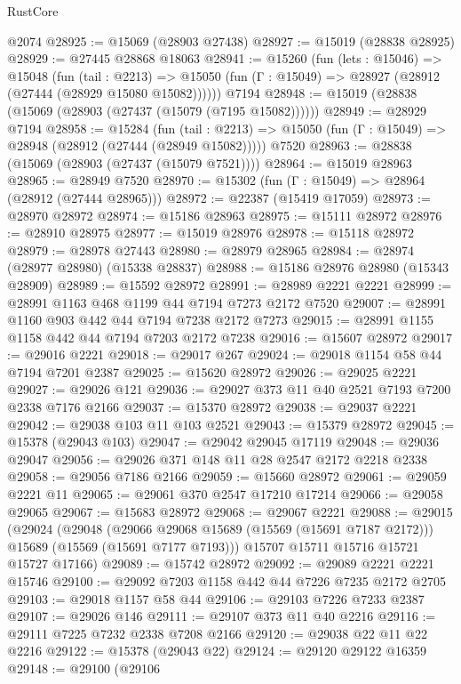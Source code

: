 \begin{lexlean}{RustCore}
\begin{coremodule}
    @2074
@28925 := @15069 (@28903 @27438)
@28927 := @15019 (@28838 @28925)
@28929 := @27445 @28868 @18063
@28941 := @15260
    (fun (lets : @15046) =>
    @15048
      (fun (tail : @2213) =>
      @15050 (fun (Γ : @15049) => @28927 (@28912 (@27444 (@28929 @15080 @15082))))))
    @7194
@28948 := @15019 (@28838 (@15069 (@28903 (@27437 (@15079 (@7195 @15082))))))
@28949 := @28929 @7194
@28958 := @15284
    (fun (tail : @2213) => @15050 (fun (Γ : @15049) => @28948 (@28912 (@27444 (@28949 @15082)))))
    @7520
@28963 := @28838 (@15069 (@28903 (@27437 (@15079 @7521))))
@28964 := @15019 @28963
@28965 := @28949 @7520
@28970 := @15302 (fun (Γ : @15049) => @28964 (@28912 (@27444 @28965)))
@28972 := @22387 (@15419 @17059)
@28973 := @28970 @28972
@28974 := @15186 @28963
@28975 := @15111 @28972
@28976 := @28910 @28975
@28977 := @15019 @28976
@28978 := @15118 @28972
@28979 := @28978 @27443
@28980 := @28979 @28965
@28984 := @28974 (@28977 @28980) (@15338 @28837)
@28988 := @15186 @28976 @28980 (@15343 @28909)
@28989 := @15592 @28972
@28991 := @28989 @2221 @2221
@28999 := @28991 @1163 @468 @1199 @44 @7194 @7273 @2172 @7520
@29007 := @28991 @1160 @903 @442 @44 @7194 @7238 @2172 @7273
@29015 := @28991 @1155 @1158 @442 @44 @7194 @7203 @2172 @7238
@29016 := @15607 @28972
@29017 := @29016 @2221
@29018 := @29017 @267
@29024 := @29018 @1154 @58 @44 @7194 @7201 @2387
@29025 := @15620 @28972
@29026 := @29025 @2221
@29027 := @29026 @121
@29036 := @29027 @373 @11 @40 @2521 @7193 @7200 @2338 @7176 @2166
@29037 := @15370 @28972
@29038 := @29037 @2221
@29042 := @29038 @103 @11 @103 @2521
@29043 := @15379 @28972
@29045 := @15378 (@29043 @103)
@29047 := @29042 @29045 @17119
@29048 := @29036 @29047
@29056 := @29026 @371 @148 @11 @28 @2547 @2172 @2218 @2338
@29058 := @29056 @7186 @2166
@29059 := @15660 @28972
@29061 := @29059 @2221 @11
@29065 := @29061 @370 @2547 @17210 @17214
@29066 := @29058 @29065
@29067 := @15683 @28972
@29068 := @29067 @2221
@29088 := @29015
    (@29024
      (@29048
        (@29066 @29068 @15689 (@15569 (@15691 @7187 @2172)))
        @15689
        (@15569 (@15691 @7177 @7193)))
      @15707
      @15711
      @15716
      @15721
      @15727
      @17166)
@29089 := @15742 @28972
@29092 := @29089 @2221 @2221 @15746
@29100 := @29092 @7203 @1158 @442 @44 @7226 @7235 @2172 @2705
@29103 := @29018 @1157 @58 @44
@29106 := @29103 @7226 @7233 @2387
@29107 := @29026 @146
@29111 := @29107 @373 @11 @40 @2216
@29116 := @29111 @7225 @7232 @2338 @7208 @2166
@29120 := @29038 @22 @11 @22 @2216
@29122 := @15378 (@29043 @22)
@29124 := @29120 @29122 @16359
@29148 := @29100
    (@29106

\end{coremodule}
\end{lexlean}
